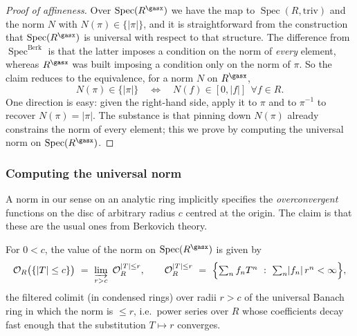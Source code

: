 \begin{proof}[Proof of affineness]
Over $\operatorname{Spec}(R^\gasx)$ we have the map to
$\operatorname{Spec}(R,\mathrm{triv})$ and the norm $N$ with
$N(\pi)\in\{\lvert\pi\rvert\}$, and it is straightforward from the construction
that $\operatorname{Spec}(R^\gasx)$ is universal with respect to that structure.
The difference from $\operatorname{Spec}^{\mathrm{Berk}}$ is that the latter
imposes a condition on the norm of \emph{every} element, whereas $R^\gasx$ was
built imposing a condition only on the norm of $\pi$. So the claim reduces to
the equivalence, for a norm $N$ on $R^\gasx$,
\begin{equation}
\label{eq:23:equivalence}
N(\pi)\in\{\lvert\pi\rvert\}
\quad\Longleftrightarrow\quad
N(f)\in[0,\lvert f\rvert]\ \ \forall f\in R .
\end{equation}
One direction is easy: given the right-hand side, apply it to $\pi$ and to
$\pi^{-1}$ to recover $N(\pi)=\lvert\pi\rvert$. The substance is that pinning
down $N(\pi)$ already constrains the norm of every element; this we prove by
computing the universal norm on $\operatorname{Spec}(R^\gasx)$.
\end{proof}

\subsubsection*{Computing the universal norm}

A norm in our sense on an analytic ring implicitly specifies the
\emph{overconvergent} functions on the disc of arbitrary radius $c$ centred at
the origin. The claim is that these are the usual ones from Berkovich theory.

\begin{proposition}
\label{prop:23:overconvergent}
For $0<c$, the value of the norm on $\operatorname{Spec}(R^\gasx)$ is given by
\begin{equation}
\label{eq:23:overconvergent}
\mathcal O_R\bigl(\{\lvert T\rvert\le c\}\bigr)\ =\
\varinjlim_{r>c}\ \mathcal O_R^{\lvert T\rvert\le r},
\qquad
\mathcal O_R^{\lvert T\rvert\le r}\ =\ \Bigl\{\textstyle\sum_n f_n T^n\ :\
\sum_n\lvert f_n\rvert\,r^n<\infty\Bigr\},
\end{equation}
the filtered colimit (in condensed rings) over radii $r>c$ of the universal
Banach ring in which the norm is $\le r$, i.e.\ power series over $R$ whose
coefficients decay fast enough that the substitution $T\mapsto r$ converges.
\end{proposition}

